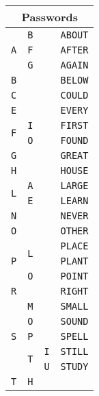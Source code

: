 \documentclass[11pt]{article}
\begin{document}
\begin{multicols}{3}
\begin{tabular}{|ccc|c|}
\hline
\multicolumn{4}{|c|}{Passwords} \\
\hline
\multirow{3}{*}{\texttt{A}} & \texttt{B} & & \texttt{ABOUT} \\
\cline{2-4}
                            & \texttt{F} & & \texttt{AFTER} \\
\cline{2-4}
                            & \texttt{G} & & \texttt{AGAIN} \\
\hline
\texttt{B} & & & \texttt{BELOW} \\
\hline
\texttt{C} & & & \texttt{COULD} \\
\hline
\texttt{E} & & & \texttt{EVERY} \\
\hline
\multirow{2}{*}{\texttt{F}} & \texttt{I} & & \texttt{FIRST} \\
\cline{2-4}
                            & \texttt{O} & & \texttt{FOUND} \\
\hline
\texttt{G} & & & \texttt{GREAT} \\
\hline
\texttt{H} & & & \texttt{HOUSE} \\
\hline
\multirow{2}{*}{\texttt{L}} & \texttt{A} & & \texttt{LARGE} \\
\cline{2-4}
                            & \texttt{E} & & \texttt{LEARN} \\
\hline
\texttt{N} & & & \texttt{NEVER} \\
\hline
\texttt{O} & & & \texttt{OTHER} \\
\hline
\multirow{3}{*}{\texttt{P}} & \multirow{2}{*}{\texttt{L}} & & \texttt{PLACE} \\
                            &                             & & \texttt{PLANT} \\
\cline{2-4}
                            & \texttt{O} & & \texttt{POINT} \\
\hline
\texttt{R} & & & \texttt{RIGHT} \\
\hline
\multirow{5}{*}{\texttt{S}} & \texttt{M} & & \texttt{SMALL} \\
\cline{2-4}
                            & \texttt{O} & & \texttt{SOUND} \\
\cline{2-4}
                            & \texttt{P} & & \texttt{SPELL} \\
\cline{2-4}
                            & \multirow{2}{*}{\texttt{T}}
                              & \texttt{I} & \texttt{STILL} \\
\cline{3-4}
                            & & \texttt{U} & \texttt{STUDY} \\
\hline
\multirow{6}{*}{\texttt{T}} & \multirow{6}{*}{\texttt{H}} &

\end{tabular}
\end{multicols}
\end{document}
